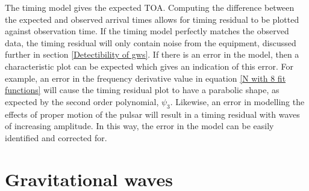 \documentclass[12pt]{article}
\begin{document}
	The timing model gives the expected TOA. Computing the difference between the expected and observed arrival times allows for timing residual to be plotted against observation time. If the timing model perfectly matches the observed data, the timing residual will only contain noise from the equipment, discussed further in section \ref{Detectibility of gws}. If there is an error in the model, then a characteristic plot can be expected which gives an indication of this error. For example, an error in the frequency derivative value in equation \ref{N with 8 fit functions} will cause the timing residual plot to have a parabolic shape, as expected by the second order polynomial, $\psi_3$. Likewise, an error in modelling the effects of proper motion of the pulsar will result in a timing residual with waves of increasing amplitude. In this way, the error in the model can be easily identified and corrected for. 

	\section{Gravitational waves}
	
\end{document}
